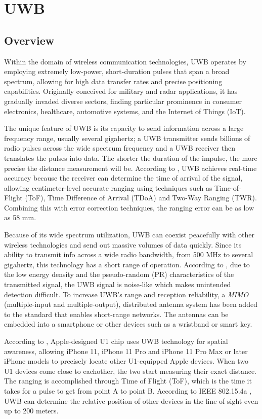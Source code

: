 \documentclass[english]{article}
\begin{document}
\section{UWB}\label{sec:uwb}
\subsection{Overview}
Within the domain of wireless communication technologies, UWB operates by employing extremely low-power, short-duration pulses that span a broad spectrum, allowing for high data transfer rates and precise positioning capabilities. Originally conceived for military and radar applications, it has gradually invaded diverse sectors, finding particular prominence in consumer electronics, healthcare, automotive systems, and the Internet of Things (IoT).

The unique feature of UWB is its capacity to send information across a large frequency range, usually several gigahertz; a UWB transmitter sends billions of radio pulses across the wide spectrum frequency and a UWB receiver then translates the pulses into data. The shorter the duration of the impulse, the more precise the distance measurement will be. According to \cite{Coppens2022}, UWB achieves real-time accuracy because the receiver can determine the time of arrival of the signal, allowing centimeter-level accurate ranging using techniques such as Time-of-Flight (ToF), Time Difference of Arrival (TDoA) and Two-Way Ranging (TWR). Combining
this with error correction techniques, the ranging error can
be as low as 58 mm.

Because of its wide spectrum utilization, UWB can coexist peacefully with other wireless technologies and send out massive volumes of data quickly.  Since its ability to transmit info across a wide radio bandwidth, from 500 MHz to several gigahertz, this technology has a short range of operation. According to \cite{di2006uwb}, due to the low energy density and the pseudo-random (PR) characteristics of the transmitted signal, the UWB signal is noise-like which makes unintended detection difficult. To increase UWB’s range and reception reliability, a \textit{MIMO} (multiple-input and multiple-output), distributed antenna system has been added to the standard that enables short-range networks. The antennas can be embedded into a smartphone or other devices such as a wristband or smart key.

According to \cite{aps}, Apple-designed U1 chip uses UWB technology for spatial awareness, allowing iPhone 11, iPhone 11 Pro and iPhone 11 Pro Max or later iPhone models to precisely locate other U1-equipped Apple devices.
When two U1 devices come close to eachother, the two start measuring their exact distance. The ranging is accomplished through Time of Flight (ToF), which is the time it takes for a pulse to get from point A to point B. According to IEEE 802.15.4a \cite{5394030}, UWB can determine the relative position of other devices in the line of sight even up to 200 meters.
\end{document}
